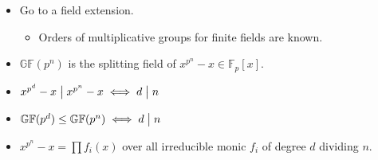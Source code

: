 \begin{concept}

\envlist

\begin{itemize}
\tightlist
\item
  Go to a field extension.

  \begin{itemize}
  \tightlist
  \item
    Orders of multiplicative groups for finite fields are known.
  \end{itemize}
\item
  \({\mathbb{GF}}(p^n)\) is the splitting field of
  \(x^{p^n} - x \in {\mathbb{F}}_p[x]\).
\item
  \(x^{p^d} - x \bigm|x^{p^n} - x \iff d \bigm|n\)
\item
  \({\mathbb{GF}}(p^d) \leq {\mathbb{GF}}(p^n) \iff d\bigm|n\)
\item
  \(x^{p^n} - x = \prod f_i(x)\) over all irreducible monic \(f_i\) of
  degree \(d\) dividing \(n\).
\end{itemize}

\end{concept}

